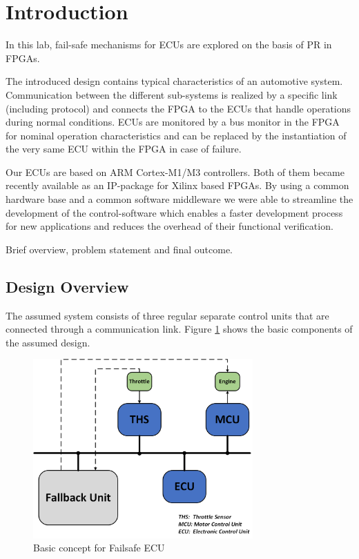 \section{Introduction}


In this lab, fail-safe mechanisms for \glspl{ECU} are explored on the basis of \gls{PR} in \glspl{FPGA}.

The introduced design contains typical characteristics of an automotive system.
Communication between the different sub-systems is realized by a specific link (including protocol) and connects the \gls{FPGA} to the \glspl{ECU} that handle operations during normal conditions. 
\glspl{ECU} are monitored by a bus monitor in the \gls{FPGA} for nominal operation characteristics and can be replaced by the instantiation of the very same \gls{ECU} within the \gls{FPGA} in case of failure.

Our \glspl{ECU} are based on ARM Cortex-M1/M3 controllers. Both of them became recently available as an \gls{IP}-package for Xilinx based \glspl{FPGA}.
By using a common hardware base and a common software middleware we were able to streamline the development of the control-software which enables a faster development process for new applications and reduces the overhead of their functional verification.
 
Brief overview, problem statement and final outcome.

\subsection{Design Overview}

The assumed system consists of three regular separate control units that are connected through a communication link. Figure \ref{fig:basicDesign} shows the basic components of the assumed design.

\begin{figure}[h!]
    \centering
    \includegraphics[width=0.75\textwidth]{figures/basic_design.png}
    \caption{Basic concept for Failsafe ECU}\label{fig:basicDesign}
\end{figure}

